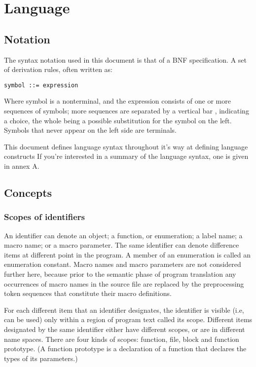 \documentclass{article}
\begin{document}
\pagebreak
\section{Language}
\subsection{Notation}
The syntax notation used in this document is that of a BNF specification.  A set of
derivation rules, often written as:
\begin{lstlisting}[language=bnf]
	symbol ::= expression
\end{lstlisting}
Where symbol is a nonterminal, and the expression consists of one or more sequences of
symbols; more sequences are separated by a vertical bar \textbar, indicating a choice,
the whole being a possible substitution for the symbol on the left.  Symbols that never
appear on the left side are terminals.
\linebreak

This document defines language syntax throughout it's way at defining language
constructs If you're interested in a summary of the language syntax, one is given in 
annex A.

\subsection{Concepts}
\subsubsection{Scopes of identifiers}
An identifier can denote an object; a function, or enumeration; a label name; a macro
name; or a macro parameter. The same identifier can denote difference items at different
point in the program. A member of an enumeration is called an enumeration constant.
Macro names and macro parameters are not considered further here, because prior to the
semantic phase of program translation any occurrences of macro names in the source file
are replaced by the preprocessing token sequences that constitute their macro definitions.
\linebreak

For each different item that an identifier designates, the identifier is visible (i.e, 
can be used) only within a region of program text called its scope.  Different items 
designated by the same identifier either have different scopes, or are in different name
spaces. There are four kinds of scopes: function, file, block and function prototype.
(A function prototype is a declaration of a function that declares the types of its
parameters.)
\linebreak
\end{document}
